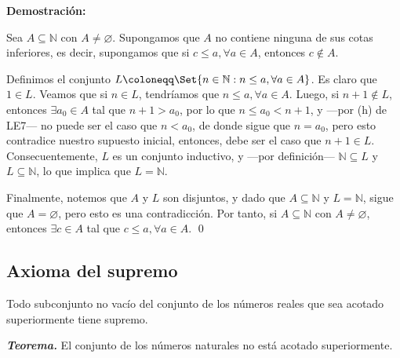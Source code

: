 \documentclass[11pt]{article}
\newcommand{\N}{\mathbb{N}}
\newcommand{\R}{\mathbb{R}}
\newcommand{\defined}{\coloneqq}
\let\for\forall
\let\emptyset\varnothing
\let\set\Set
\begin{document}
\pagebreak

\textbf{Demostración:}

Sea $A\subseteq \N$ con $A\neq \emptyset$. Supongamos que $A$ no contiene ninguna de sus cotas inferiores, es decir, supongamos que si $c\leq a, \forall a\in A$, entonces $c\notin A$.

Definimos el conjunto $L\coloneqq \set{n\in \N: n\leq a, \forall a\in A}$. Es claro que $1\in L$. Veamos que si $n\in L$, tendríamos que $n\leq a, \for a\in A$. Luego, si $n+1\notin L$, entonces $\exists a_0\in A$ tal que $n+1>a_0$, por lo que $n\leq a_0<n+1$, y —por (h) de LE7— no puede ser el caso que $n<a_0$, de donde sigue que $n=a_0$, pero esto contradice nuestro supuesto inicial, entonces, debe ser el caso que $n+1\in L$. Consecuentemente, $L$ es un conjunto inductivo, y —por definición— $\N\subseteq L$ y $L\subseteq \N$, lo que implica que $L=\N$.

Finalmente, notemos que $A$ y $L$ son disjuntos, y dado que $A\subseteq \N$ y $L=\N$, sigue que $A=\emptyset$, pero esto es una contradicción. Por tanto, si $A\subseteq \N$ con $A\neq \emptyset$, entonces $\exists c\in A$ tal que $c\leq a, \forall a\in A$. \qed

%
%
%
%
\subsection*{Axioma del supremo}

Todo subconjunto no vacío del conjunto de los números reales que sea acotado superiormente tiene supremo.

\textbf{\textit{Teorema.}} El conjunto de los números naturales no está acotado superiormente.
\end{document}
